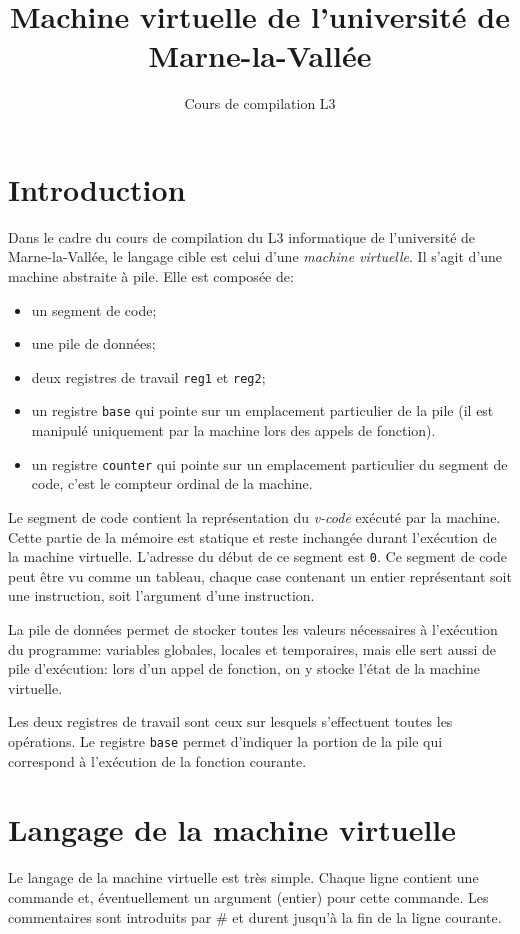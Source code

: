 \documentclass[12pt,a4]{article}
\title{Machine virtuelle de l'université de Marne-la-Vallée}
\author{Cours de compilation L3}
\begin{document}
\maketitle

\bigskip
\section{Introduction}

Dans le cadre du cours de compilation du L3 informatique de
l'université de Marne-la-Vallée, le langage cible est celui d'une {\em
  machine virtuelle}. Il s'agit d'une machine abstraite à pile.  Elle
est composée de:
\begin{itemize}
\item un segment de code;
\item une pile de données;
\item deux registres de travail {\tt reg1} et {\tt reg2};
\item un registre {\tt base} qui pointe sur un emplacement
  particulier de la pile (il est manipulé uniquement par la machine
  lors des appels de fonction).
\item un registre {\tt counter} qui pointe sur un emplacement
  particulier du segment de code, c'est le compteur ordinal de la
  machine.
\end{itemize}

Le segment de code contient la représentation du {\it v-code} exécuté
par la machine. Cette partie de la mémoire est statique et reste
inchangée durant l'exécution de la machine virtuelle. L'adresse du
début de ce segment est {\tt 0}. Ce segment de code peut être vu comme
un tableau, chaque case contenant un entier représentant soit une
instruction, soit l'argument d'une instruction.

La pile de données permet de stocker toutes les valeurs nécessaires à
l'exécution du programme: variables globales, locales et temporaires,
mais elle sert aussi de pile d'exécution: lors d'un appel de fonction,
on y stocke l'état de la machine virtuelle.

Les deux registres de travail sont ceux sur lesquels s'effectuent
toutes les opérations. Le registre {\tt base} permet d'indiquer la
portion de la pile qui correspond à l'exécution de la fonction
courante.

\section{Langage de la machine virtuelle}
Le langage de la machine virtuelle est très simple. Chaque ligne
contient une commande et, éventuellement un
argument (entier) pour cette commande.
Les commentaires sont introduits par \# et durent jusqu'à la fin de la
ligne courante.
\end{document}
